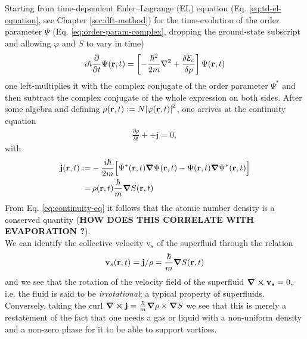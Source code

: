 \documentclass[12pt,a4paper]{book}
\renewcommand{\vec}[1]{\bm{\mathrm{#1}}}
\begin{document}
			Starting from time-dependent Euler--Lagrange (EL) equation (Eq. \ref{eq:td-el-equation}, see Chapter \ref{sec:dft-method}) for the time-evolution of the order parameter $\Psi$ (Eq. \ref{eq:order-param-complex}, dropping the ground-state subscript and allowing $\varphi$ and $S$ to vary in time)
			\begin{align}
				i\hbar\frac{\partial}{\partial t} \Psi({\mathbf r},t) = \left[-\frac{\hbar^2}{2m}\laplacian + \frac{\delta{\cal E}_{c}}{\delta\rho}\right]\Psi(\textbf{r},t)
			\end{align}
			one left-multiplies it with the complex conjugate of the order parameter $\Psi^*$ and then subtract the complex conjugate of the whole expression on both sides. After some algebra and defining $\rho(\vec{r},t)\vcentcolon=N\abs{\varphi(\vec{r},t)}^2$, one arrives at the continuity equation
			\begin{align}
				\frac{\partial\rho}{\partial t} + \div{\vec{j}}=0, \label{eq:continuity-eq}
			\end{align}
			with
			\begin{align}
				\vec{j}(\vec{r},t) \vcentcolon=& -\frac{i\hbar}{2m}\qty\Big[\Psi^*(\vec{r},t)\grad{\Psi}(\vec{r},t) - \Psi(\vec{r},t)\grad{\Psi^*}(\vec{r},t)] \\
					=&\,\rho(\vec{r},t)\frac{\hbar}{m}\grad{S(\vec{r},t)}
			\end{align}
			From Eq. \ref{eq:continuity-eq} it follows that the atomic number density is a conserved quantity (\textbf{HOW DOES THIS CORRELATE WITH EVAPORATION ?}).\\
			
			We can identify the collective velocity $\vec{v}_s$ of the superfluid through the relation
			\begin{align}
				\vec{v}_s(\vec{r},t) = \vec{j}/\rho=\frac{\hbar}{m}\grad{S(\vec{r},t)} \label{eq:velocity-field}
			\end{align}
			and we see that the rotation of the velocity field of the superfluid $\curl{\vec{v}_s}=0$, i.e. the fluid is said to be \emph{irrotational}; a typical property of superfluids. Conversely, taking the curl $\curl{\vec{j}}=\frac{\hbar}{m}\grad{\rho}\times\grad{S}$ we see that this is merely a restatement of the fact that one needs a gas or liquid with a non-uniform density and a non-zero phase for it to be able to support vortices.\\
			
\end{document}
